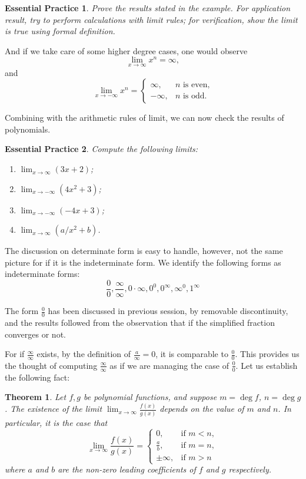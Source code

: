 \documentclass[12pt]{article}
\newtheorem*{theorem}{Theorem}
\newtheorem{exercise}{Essential Practice}[section]
\begin{document}
    \begin{exercise}
        Prove the results stated in the example. For application result, try to perform calculations with limit rules; for verification, show the limit is true using formal definition.
    \end{exercise}

    And if we take care of some higher degree cases, one would observe \[\lim_{x\to \infty}x^n = \infty,\] and \[\lim_{x\to -\infty}x^n = \begin{cases}
        \infty, &n\textrm{ is even,}\\
        -\infty, &n\textrm{ is odd.}
    \end{cases}\]

    Combining with the arithmetic rules of limit, we can now check the results of polynomials.

    \begin{exercise}
        Compute the following limits:\begin{enumerate}
            \item $\displaystyle\lim_{x\to \infty}(3x+2)$;
            \item $\displaystyle\lim_{x\to -\infty}(4x^2+3)$;
            \item $\displaystyle\lim_{x\to -\infty}(-4x+3)$;
            \item $\displaystyle\lim_{x\to \infty}(a/x^2+b)$.
        \end{enumerate}
    \end{exercise}

    The discussion on determinate form is easy to handle, however, not the same picture for if it is the indeterminate form. We identify the following forms as indeterminate forms: \[\frac{0}{0}, \frac{\infty}{\infty}, 0\cdot \infty, 0^0, 0^\infty, \infty^0, 1^\infty\]

    The form $\frac{0}{0}$ has been discussed in previous session, by removable discontinuity, and the results followed from the observation that if the simplified fraction converges or not.

    For if $\frac{\infty}{\infty}$ exists, by the definition of $\frac{a}{\infty}=0$, it is comparable to $\frac{0}{0}$. This provides us the thought of computing $\frac{\infty}{\infty}$ as if we are managing the case of $\frac{0}{0}$. Let us establish the following fact:

    \begin{theorem}
        Let $f,g$ be polynomial functions, and suppose $m=\deg{f}$, $n=\deg{g}$. The existence of the limit $\displaystyle\lim_{x\to \infty}\frac{f(x)}{g(x)}$ depends on the value of $m$ and $n$. In particular, it is the case that \[\lim_{x\to\infty}\frac{f(x)}{g(x)}=\begin{cases}
            0,&\textrm{if }m<n,\\
            \frac{a}{b},&\textrm{if }m=n,\\
            \pm\infty,&\textrm{if }m>n
        \end{cases}\] where $a$ and $b$ are the non-zero leading coefficients of $f$ and $g$ respectively.
    \end{theorem}
\end{document}
